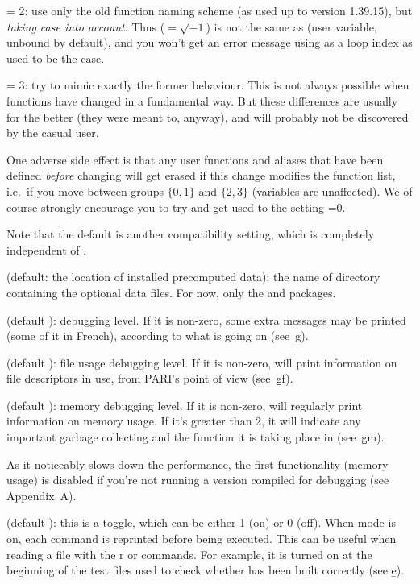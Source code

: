 \quad {} = 2: use only the old function naming scheme (as
used up to version 1.39.15), but \emph{taking case into account}. Thus
 (${}=\sqrt{-1}$) is not the same as  (user variable, unbound
by default), and you won't get an error message using  as a loop
index as used to be the case.

\quad {} = 3: try to mimic exactly the former behaviour. This
is not always possible when functions have changed in a fundamental way.
But these differences are usually for the better (they were meant to,
anyway), and will probably not be discovered by the casual user.

One adverse side effect is that any user functions and aliases that have
been defined \emph{before} changing  will get erased if this
change modifies the function list, i.e.~if you move between groups
$\{0,1\}$ and $\{2,3\}$ (variables are unaffected). We of course strongly
encourage you to try and get used to the setting =0.

Note that the default  is another compatibility setting,
which is completely independent of .

 (default: the location of installed precomputed data):
the name of directory containing the optional data files. For now,
only the  and  packages.

 (default ): debugging level. If it is non-zero,
some extra messages may be printed (some of it in French), according to
what is going on (see~\b{g}).

 (default ): file usage debugging level. If it
is non-zero,  will print information on file descriptors in use, from
PARI's point of view (see~\b{gf}).

 (default ): memory debugging level. If it is
non-zero,  will regularly print information on memory usage. If it's
greater than 2, it will indicate any important garbage collecting and the
function it is taking place in (see~\b{gm}).

 As it noticeably slows down the performance,
the first functionality (memory usage) is disabled if you're not running a
version compiled for debugging (see Appendix~A).

 (default ): this is a toggle, which can be either 1
(on) or 0 (off). When  mode is on, each command is reprinted before
being executed. This can be useful when reading a file with the \b{r} or
 commands. For example, it is turned on at the beginning of the
test files used to check whether  has been built correctly (see
\b{e}).

